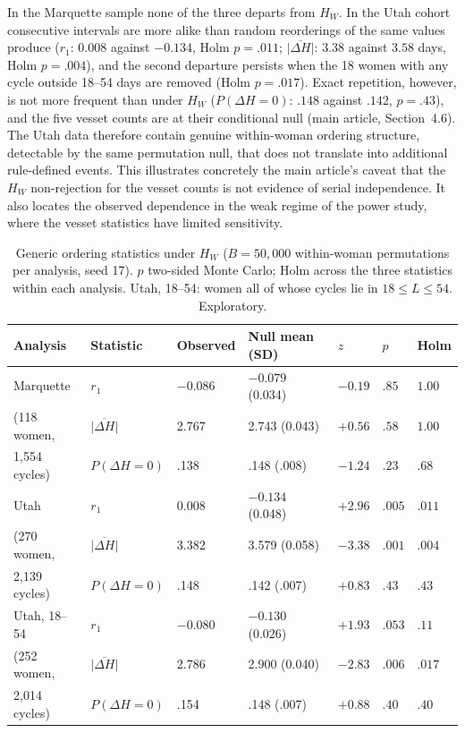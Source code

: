 \documentclass[12pt]{article}
\newcommand{\HW}{H_{W}}
\begin{document}
In the Marquette sample none of the three departs from $\HW$. In the Utah cohort
consecutive intervals are more alike than random reorderings of the same values produce
($r_1$: $0.008$ against $-0.134$, Holm $p = .011$; $\overline{|\Delta H|}$: $3.38$ against
$3.58$ days, Holm $p = .004$), and the second departure persists when the 18 women with any
cycle outside 18--54 days are removed (Holm $p = .017$). Exact repetition, however, is not
more frequent than under $\HW$ ($P(\Delta H = 0)$: $.148$ against $.142$, $p = .43$), and the
five vesset counts are at their conditional null (main article, Section~4.6). The Utah data
therefore contain genuine within-woman ordering structure, detectable by the same
permutation null, that does not translate into additional rule-defined events. This
illustrates concretely the main article's caveat that the $\HW$ non-rejection for the
vesset counts is not evidence of serial independence. It also locates the observed
dependence in the weak regime of the power study, where the vesset statistics have
limited sensitivity.

\begin{table}[!htbp]
\centering
\caption{Generic ordering statistics under $\HW$ ($B = 50{,}000$ within-woman permutations
  per analysis, seed 17). $p$ two-sided Monte Carlo; Holm across the three statistics
  within each analysis. Utah, 18--54: women all of whose cycles lie in $18 \leq L \leq 54$.
  Exploratory.}
\label{tab:si-ordering}
\smallskip
\small
\begin{tabular}{L{2.4cm} L{2.7cm} C{1.8cm} C{2.3cm} C{1.0cm} C{1.1cm} C{1.1cm}}
\toprule
\textbf{Analysis} & \textbf{Statistic} & \textbf{Observed} & \textbf{Null mean (SD)} & $z$ & $p$ & \textbf{Holm} \\
\midrule
Marquette             & $r_1$                     & $-0.086$ & $-0.079$ (0.034) & $-0.19$ & $.85$ & $1.00$ \\
(118 women,           & $\overline{|\Delta H|}$   & 2.767    & 2.743 (0.043)    & $+0.56$ & $.58$ & $1.00$ \\
1,554 cycles)         & $P(\Delta H = 0)$         & .138     & .148 (.008)      & $-1.24$ & $.23$ & $.68$ \\
\midrule
Utah                  & $r_1$                     & $0.008$  & $-0.134$ (0.048) & $+2.96$ & $.005$ & $.011$ \\
(270 women,           & $\overline{|\Delta H|}$   & 3.382    & 3.579 (0.058)    & $-3.38$ & $.001$ & $.004$ \\
2,139 cycles)         & $P(\Delta H = 0)$         & .148     & .142 (.007)      & $+0.83$ & $.43$ & $.43$ \\
\midrule
Utah, 18--54          & $r_1$                     & $-0.080$ & $-0.130$ (0.026) & $+1.93$ & $.053$ & $.11$ \\
(252 women,           & $\overline{|\Delta H|}$   & 2.786    & 2.900 (0.040)    & $-2.83$ & $.006$ & $.017$ \\
2,014 cycles)         & $P(\Delta H = 0)$         & .154     & .148 (.007)      & $+0.88$ & $.40$ & $.40$ \\
\bottomrule
\end{tabular}
\end{table}
\end{document}
